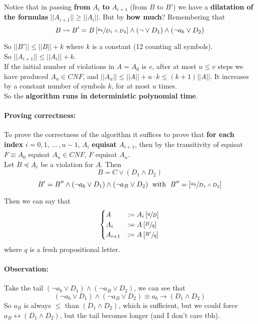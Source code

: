 \documentclass[11pt]{article}
\begin{document}
	\newpage
	
	Notice that in passing \textbf{from} $A_i$ \textbf{to} $A_{i+1}$ (from $B$ to $B'$) we have a \textbf{dilatation of the formulas} $||A_{i+1}|| \geq ||A_i||$. But by \textbf{how much}? Remembering that
	$$ B \rightsquigarrow B' = B \left[\sfrac{a_b}{D_1 \wedge D_2}\right] \wedge (\neg \vee D_1) \wedge (\neg a_b \vee D_2) $$
	
	So $||B'|| \leq ||B|| + k$ where $k$ is a constant (12 counting all symbols).\\
	So $||A_{i+1}|| \leq ||A_i|| + k$.\\
	
	If the initial number of violations in $A=A_0$ is $v$, after at most $u \leq v$ steps we have produced $A_u \in CNF$, and $||A_u|| \leq ||A|| + u \cdot k \leq (k+1) ||A||$. It increases by a constant number of symbols $k$, for at most $u$ times.\\
	
	So the \textbf{algorithm runs in deterministic polynomial time}.\\
	
	\paragraph{Proving correctness:} To prove the correctness of the algorithm it suffices to prove that \textbf{for each index} $i = 0,1, \, \dots \, , u-1$, $A_i$ \textbf{equisat} $A_{i+1}$, then by the transitivity of equisat $F \equiv A_0$ equisat $A_u \in CNF$, $F$ equisat $A_u$.\\
	
	Let $B \preceq A_i$ be a violation for $A$. Then \\
	$$ B = C \vee (D_1 \wedge D_2) $$
	$$ B' = B'' \wedge (\neg a_b \vee D_1) \wedge (\neg a_B \vee D_2) \; \text{ with } \; B'' = \left[\sfrac{a_b}{D_1 \wedge D_2}\right] $$
	
	Then we can say that
	$$
	\begin{cases}
		A & := A_i \left[\sfrac{q}{B}\right] \\
		A_i & := A \left[\sfrac{B}{q}\right] \\
		A_{i+1} & := A \left[\sfrac{B'}{q}\right]
	\end{cases}
	$$
	where $q$ is a fresh propositional letter.\\
	
	\paragraph{Observation:} Take the tail $(\neg a_b \vee D_1) \wedge (\neg a_B \vee D_2)$, we can see that
	$$  (\neg a_b \vee D_1) \wedge (\neg a_B \vee D_2) \equiv a_b \rightarrow (D_1 \wedge D_2) $$
	So $a_B$ is always $\leq$ than $(D_1 \wedge D_2)$, which is sufficient, but we could force $a_B \leftrightarrow (D_1 \wedge D_2)$, but the tail becomes longer (and I don't care tbh).
	
\end{document}
